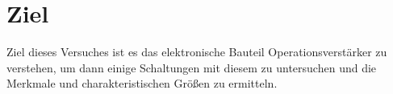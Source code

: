 \section{Ziel}
\label{sec:Ziel}
Ziel dieses Versuches ist es das elektronische Bauteil Operationsverstärker zu verstehen, um dann einige Schaltungen mit diesem zu untersuchen und die Merkmale und charakteristischen Größen zu ermitteln.